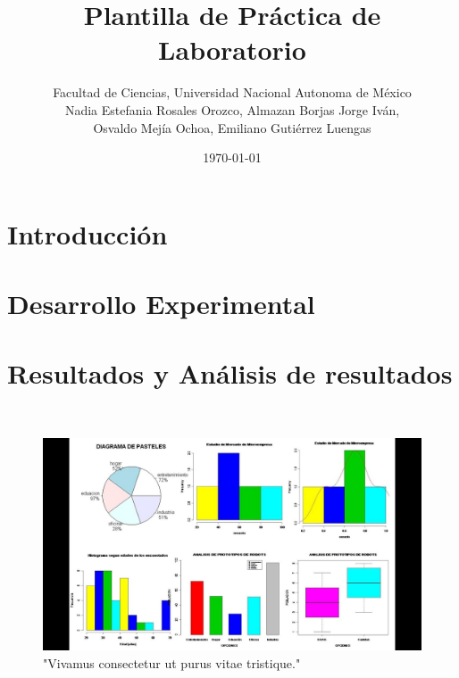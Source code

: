 \documentclass{article}
\title{Plantilla de Práctica de Laboratorio}
\author{Facultad de Ciencias, Universidad Nacional Autonoma de México\\
Nadia Estefania Rosales Orozco, Almazan Borjas Jorge Iv\'an,\\ Osvaldo Mej\'ia Ochoa, Emiliano Guti\'errez Luengas}
\date{\today}
\begin{document}
\maketitle

\begin{abstract}
    \lipsum[1]
\end{abstract}


\section{Introducci\'on}
 \lipsum[2-3]


\section{Desarrollo Experimental}
 \lipsum[4-9]


\section{Resultados y An\'alisis de resultados}
 \lipsum[10]\\

\begin{figure}[h]
    \centering
    \includegraphics[scale=0.125]{Gráficas Tarea.jpg}
    \caption{"Vivamus consectetur ut purus vitae tristique."}
    \label{fig:Vivamus consectetur ut purus vitae tristique.}
\end{figure}


 \lipsum[11-12]
\end{document}
